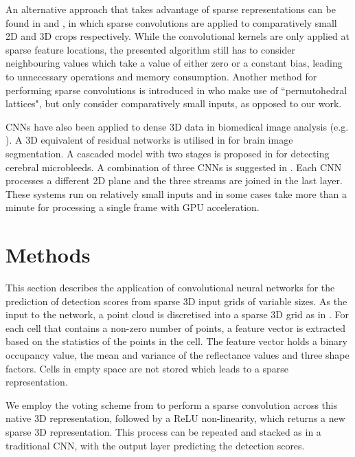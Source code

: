 \documentclass[letterpaper, 10 pt, conference]{tex_style/ieeeconf}
\begin{document}
An alternative approach that takes advantage of sparse representations can be found in \cite{graham2014spatially} and \cite{graham2015sparse}, in which sparse convolutions are applied to comparatively small 2D and 3D crops respectively.
While the convolutional kernels are only applied at sparse feature locations, the presented algorithm still has to consider neighbouring values which take a value of either zero or a constant bias, leading to unnecessary operations and memory consumption.
Another method for performing sparse convolutions is introduced in \cite{jampani2016learning} who make use of ``permutohedral lattices", but only consider comparatively small inputs, as opposed to our work.

CNNs have also been applied to dense 3D data in biomedical image analysis (e.g. \cite{chen2016voxresnet,dou2016automatic,prasoon2013deep}). A 3D equivalent of residual networks \cite{he2015deep} is utilised in \cite{chen2016voxresnet} for brain image segmentation.
A cascaded model with two stages is proposed in \cite{dou2016automatic} for detecting cerebral microbleeds.
A combination of three CNNs is suggested in \cite{prasoon2013deep}.
Each CNN processes a different 2D plane and the three streams are joined in the last layer.
These systems run on relatively small inputs and in some cases take more than a minute for processing a single frame with GPU acceleration.




%
 
\section{Methods}
\label{sec:approach}

This section describes the application of convolutional neural networks for the prediction of detection scores from sparse 3D input grids of variable sizes.
As the input to the network, a point cloud is discretised into a sparse 3D grid as in \cite{wang2015voting}.
For each cell that contains a non-zero number of points, a feature vector is extracted  based on the statistics of the points in the cell.
The feature vector holds a binary occupancy value, the mean and variance of the reflectance values and three shape factors.
Cells in empty space are not stored which leads to a sparse representation.

We employ the voting scheme from \cite{wang2015voting} to perform a sparse convolution across this native 3D representation, followed by a ReLU non-linearity, which returns a new sparse 3D representation.
This process can be repeated and stacked as in a traditional CNN, with the output layer predicting the detection scores.
\end{document}
